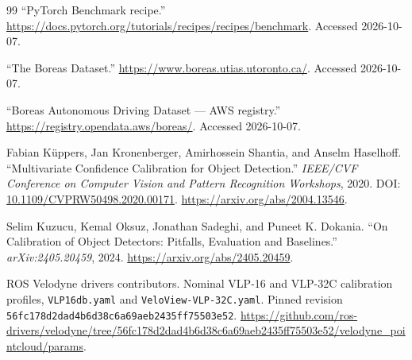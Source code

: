 \documentclass[10pt,twocolumn]{article}
\begin{document}
\begin{thebibliography}{99}
 ``PyTorch Benchmark recipe.'' \url{https://docs.pytorch.org/tutorials/recipes/recipes/benchmark}. Accessed 2026-10-07.

 ``The Boreas Dataset.'' \url{https://www.boreas.utias.utoronto.ca/}. Accessed 2026-10-07.

 ``Boreas Autonomous Driving Dataset --- AWS registry.'' \url{https://registry.opendata.aws/boreas/}. Accessed 2026-10-07.

 Fabian K\"uppers, Jan Kronenberger, Amirhossein Shantia, and Anselm Haselhoff. ``Multivariate Confidence Calibration for Object Detection.'' \textit{IEEE/CVF Conference on Computer Vision and Pattern Recognition Workshops}, 2020. DOI: \href{https://doi.org/10.1109/CVPRW50498.2020.00171}{10.1109/CVPRW50498.2020.00171}. \url{https://arxiv.org/abs/2004.13546}.

 Selim Kuzucu, Kemal Oksuz, Jonathan Sadeghi, and Puneet K. Dokania. ``On Calibration of Object Detectors: Pitfalls, Evaluation and Baselines.'' \textit{arXiv:2405.20459}, 2024. \url{https://arxiv.org/abs/2405.20459}.

 ROS Velodyne drivers contributors. Nominal VLP-16 and VLP-32C calibration profiles, \texttt{VLP16db.yaml} and \texttt{VeloView-VLP-32C.yaml}. Pinned revision \texttt{56fc178d2dad4b6d38c6a69aeb2435ff75503e52}. \url{https://github.com/ros-drivers/velodyne/tree/56fc178d2dad4b6d38c6a69aeb2435ff75503e52/velodyne_pointcloud/params}.

\end{thebibliography}
\end{document}

